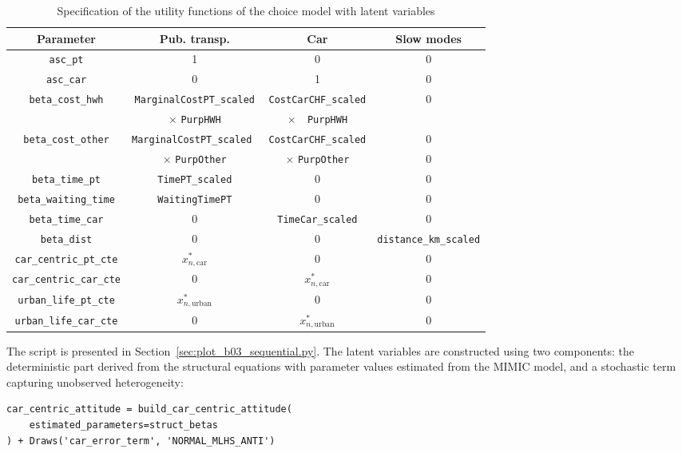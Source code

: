 \documentclass[12pt,a4paper]{article}
\begin{document}
\begin{table}[htb]
  \begin{tabular}{cccc}
Parameter    & Pub. transp. & Car & Slow modes \\
    \hline
    \hline
\lstinline$asc_pt$ &    1 &   0 &  0 \\
    \hline
\lstinline$asc_car$ &   0 &   1 &  0 \\
    \hline
\lstinline$beta_cost_hwh$ & \lstinline$MarginalCostPT_scaled$ & \lstinline$CostCarCHF_scaled$ & 0 \\
 & $\times$ \lstinline$PurpHWH$ & $\times$\lstinline$  PurpHWH$ & \\
    \hline
\lstinline$beta_cost_other$  & \lstinline$MarginalCostPT_scaled $ & \lstinline$CostCarCHF_scaled$ & 0 \\
& $\times$ \lstinline$PurpOther$ & $\times$ \lstinline$PurpOther$& 0 \\
    \hline
\lstinline$beta_time_pt$ & \lstinline$TimePT_scaled$ & 0 & 0 \\
    \hline
\lstinline$beta_waiting_time$ & \lstinline$WaitingTimePT$ & 0 & 0 \\
    \hline
\lstinline$beta_time_car$ & 0 & \lstinline$TimeCar_scaled$ & 0\\
    \hline
\lstinline$beta_dist$ & 0 & 0 & \lstinline$distance_km_scaled$ \\
\hline
\lstinline$car_centric_pt_cte$ & $x_{n,\text{car}}^*$ & 0 & 0 \\
\lstinline$car_centric_car_cte$ &  0 & $x_{n,\text{car}}^*$ & 0 \\
\lstinline$urban_life_pt_cte$ & $x_{n,\text{urban}}^*$ & 0 & 0  \\
\lstinline$urban_life_car_cte$ & 0 & $x_{n,\text{urban}}^*$ & 0\\
  \end{tabular}
  \caption{\label{tab:spec_choice_lv}Specification of the utility functions of the choice model with latent variables}
\end{table}

The script is presented in
Section~\ref{sec:plot_b03_sequential.py}. The latent variables are
constructed using two components: the deterministic part derived from
the structural equations with parameter values estimated from the
MIMIC model, and a stochastic term capturing unobserved heterogeneity:
\begin{lstlisting}
car_centric_attitude = build_car_centric_attitude(
    estimated_parameters=struct_betas
) + Draws('car_error_term', 'NORMAL_MLHS_ANTI')
\end{lstlisting}
\end{document}
